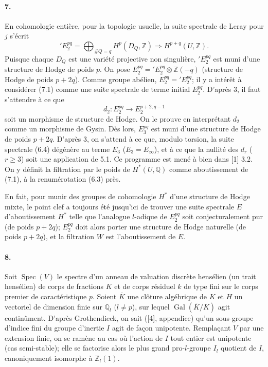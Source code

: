 \documentclass[10pt]{article}
\newcommand{\Q}{\mathbb Q}
\newcommand{\Z}{\mathbb Z}
\newcommand{\Gal}{\operatorname{Gal}}
\newcommand{\Spec}{\operatorname{Spec}}
\newcommand{\barK}{\overline{K}}
\begin{document}
\paragraph{7.} En cohomologie entière, pour la topologie usuelle, la suite spectrale de Leray pour $j$ s'écrit
\[
\tag{7.1}
{}'E_2^{pq}=\bigoplus_{\#Q=q}H^p(D_Q,\Z)\Rightarrow H^{p+q}(U,\Z).
\]
Puisque chaque $D_Q$ est une variété projective non singulière, ${}'E_2^{pq}$ est muni d'une structure de Hodge de poids $p$. On pose $E_2^{pq}={}'E_2^{pq}\otimes\Z(-q)$ (structure de Hodge de poids $p+2q$). Comme groupe abélien, $E_2^{pq}={}'E_2^{pq}$; il y a intérêt à considérer (7.1) comme une suite spectrale de terme initial $E_2^{pq}$. D'après 3, il faut s'attendre à ce que
\[
d_2:E_2^{pq}\to E_2^{p+2,q-1}
\]
soit un morphisme de structure de Hodge. On le prouve en interprétant $d_2$ comme un morphisme de Gysin. Dès lors, $E_3^{pq}$ est muni d'une structure de Hodge de poids $p+2q$. D'après 3, on s'attend à ce que, modulo torsion, la suite spectrale (6.4) %
dégénère au terme $E_3$ ($E_3=E_\infty$), et à ce que la nullité des $d_r$ ($r\ge3$) soit une application de 5.1. Ce programme est mené à bien dans [1] 3.2. On y définit la filtration par le poids de $H^*(U,\Q)$ comme aboutissement de (7.1), à la renumérotation (6.3) près.

En fait, pour munir des groupes de cohomologie $H^*$ d'une structure de Hodge mixte, le point clef a toujours été jusqu'ici de trouver une suite spectrale $E$ d'aboutissement $H^*$ telle que l'analogue $l$-adique de $E_2^{pq}$ soit conjecturalement pur (de poids $p+2q$); $E_2^{pq}$ doit alors porter une structure de Hodge naturelle (de poids $p+2q$), et la filtration $W$ est l'aboutissement de $E$.

\paragraph{8.} Soit $\Spec(V)$ le spectre d'un anneau de valuation discrète hensélien (un trait hensélien) de corps de fractions $K$ et de corps résiduel $k$ de type fini sur le corps premier de caractéristique $p$. Soient $\barK$ une clôture algébrique de $K$ et $H$ un vectoriel de dimension finie sur $\Q_l$ ($l\ne p$), sur lequel $\Gal(\barK/K)$ agit continûment. D'après Grothendieck, on sait ([4], appendice) qu'un sous-groupe d'indice fini du groupe d'inertie $I$ agit de façon unipotente. Remplaçant $V$ par une extension finie, on se ramène au cas où l'action de $I$ tout entier est unipotente (cas semi-stable); elle se factorise alors le plus grand pro-$l$-groupe $I_l$ quotient de $I$, canoniquement isomorphe à $\Z_l(1)$. %
\end{document}
